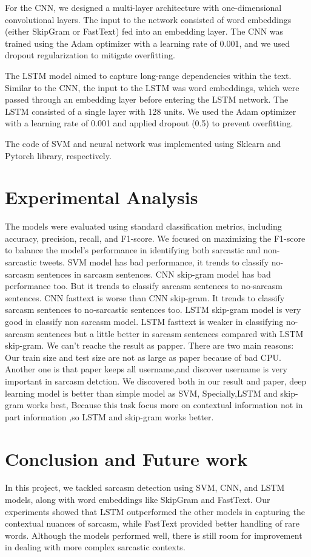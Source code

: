 \documentclass[11pt]{article}
\begin{document}
For the CNN, we designed a multi-layer architecture with one-dimensional convolutional layers. The input to the network consisted of word embeddings (either SkipGram or FastText) fed into an embedding layer. The CNN was trained using the Adam optimizer with a learning rate of 0.001, and we used dropout regularization to mitigate overfitting.

The LSTM model aimed to capture long-range dependencies within the text. Similar to the CNN, the input to the LSTM was word embeddings, which were passed through an embedding layer before entering the LSTM network. The LSTM consisted of a single layer with 128 units. We used the Adam optimizer with a learning rate of 0.001 and applied dropout (0.5) to prevent overfitting.

The code of SVM and neural network was implemented using Sklearn and Pytorch library, respectively.

\section{Experimental Analysis}%
The models were evaluated using standard classification metrics, including accuracy, precision, recall, and F1-score. We focused on maximizing the F1-score to balance the model’s performance in identifying both sarcastic and non-sarcastic tweets. 
SVM model has bad performance, it trends to classify no-sarcasm sentences in sarcasm sentences.
CNN skip-gram model has bad performance too. But it trends to classify sarcasm sentences to no-sarcasm sentences.
CNN fasttext is worse than CNN skip-gram. It trends to classify sarcasm sentences to no-sarcastic sentences too.
LSTM skip-gram model is very good in classify non sarcasm model.
LSTM fasttext is weaker in classifying no-sarcasm sentences but a little better in sarcasm sentences compared with LSTM skip-gram.
We can't reache the result as papper. There are two main reasons: Our train size and test size are not as large as paper because of bad CPU. Another one is that paper keeps all username,and discover username is very important in sarcasm detction.
We discovered both in our result and paper, deep learning model is better than simple model as SVM, Specially,LSTM and skip-gram works best, Because this task focus more on contextual information not in part information ,so LSTM and skip-gram works better.


\section{Conclusion and Future work}
In this project, we tackled sarcasm detection using SVM, CNN, and LSTM models, along with word embeddings like SkipGram and FastText. Our experiments showed that LSTM outperformed the other models in capturing the contextual nuances of sarcasm, while FastText provided better handling of rare words. Although the models performed well, there is still room for improvement in dealing with more complex sarcastic contexts.
\end{document}
